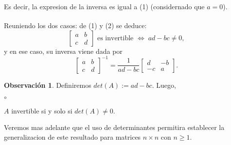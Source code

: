 \documentclass{article}
\theoremstyle{definition}
\theoremstyle{definition}
\newtheorem*{obs}{Observación}
\theoremstyle{remark}
\begin{document}
   Es decir, la expresion de la inversa es igual a (1) (considernado que $a=0$).
   \\\\
   Reuniendo los dos casos: de (1) y (2) se deduce: \[
     \begin{bmatrix} a & b \\ c & d \end{bmatrix} \text{ es invertible } \Leftrightarrow \; ad-bc\neq 0,
   \]
   y en ese caso, su inversa viene dada por \[
     \begin{bmatrix} a & b \\ c & d \end{bmatrix}^{-1} = \frac{1}{ad-bc} \begin{bmatrix}d & -b \\ -c & a \end{bmatrix}.
   \]
   \begin{obs}
     Definiremos $det(A):=ad-bc$. Luego, \begin{list}{$\circ$}{}  
\item  $A$ invertible si y solo si $det(A)\neq0$. 
\item Veremos mas adelante que el uso de determinantes permitira establecer la generalizacion de este resultado para matrices $n \times n$ con $ n \geq 1$.
\end{list}
   \end{obs}
\end{document}
